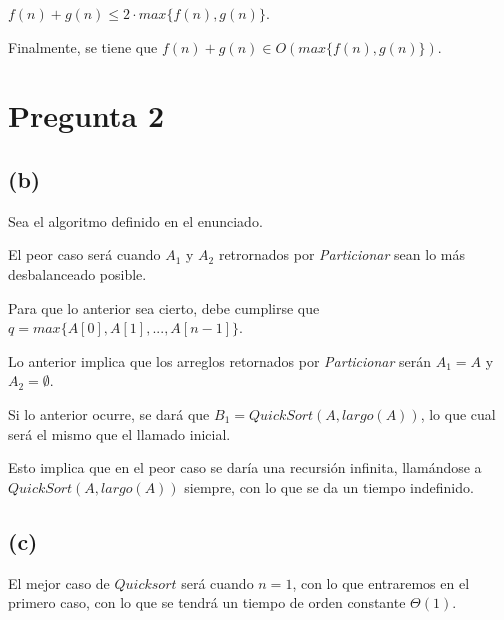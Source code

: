 \documentclass[12pt]{article}
\begin{document}
$f(n) + g(n) \leq 2 \cdot max\{f(n), g(n)\}$.

Finalmente, se tiene que $f(n) + g(n) \in O(max\{f(n), g(n)\})$.


\newpage

\section*{Pregunta 2}


\subsection*{(b)}

Sea el algoritmo definido en el enunciado.

El peor caso será cuando $A_1$ y $A_2$ retrornados por \textit{Particionar} sean lo más desbalanceado posible.

Para que lo anterior sea cierto, debe cumplirse que $q = max\{A[0], A[1], ..., A[n-1]\}$.

Lo anterior implica que los arreglos retornados por \textit{Particionar} serán $A_1 = A$ y $A_2 = \emptyset$.

Si lo anterior ocurre, se dará que $B_1 = QuickSort(A, largo(A))$, lo que cual será el mismo que el llamado inicial.

Esto implica que en el peor caso se daría una recursión infinita, llamándose a $QuickSort(A, largo(A))$ siempre, 
con lo que se da un tiempo indefinido.

\subsection*{(c)}

El mejor caso de $Quicksort$ será cuando $n = 1$, con lo que entraremos en el primero caso, 
con lo que se tendrá un tiempo de orden constante $\Theta(1)$.
\end{document}
